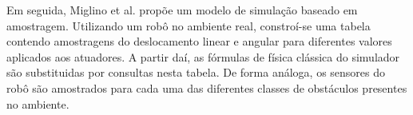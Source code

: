 Em seguida, Miglino et al. \cite{miglino96evolving} propõe um modelo de simulação baseado em amostragem. Utilizando um robô no ambiente real, constroí-se uma tabela contendo amostragens do deslocamento linear e angular para diferentes valores aplicados aos atuadores. A partir daí, as fórmulas de física clássica do simulador são substituidas por consultas nesta tabela. De forma análoga, os sensores do robô são amostrados para cada uma das diferentes classes de obstáculos presentes no ambiente.

